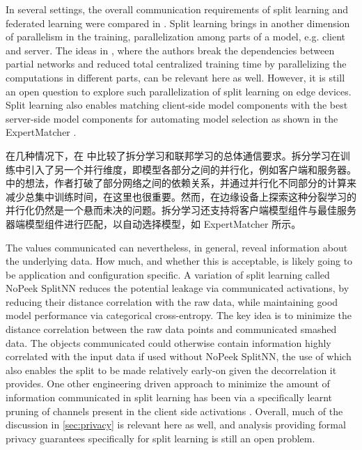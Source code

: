 In several settings, the overall communication requirements of split learning and federated learning were compared in \citep{vepakomma2019splitComm}. Split learning brings in another dimension of parallelism in the training, parallelization among parts of a model, e.g. client and server. The ideas in \citep{jaderberg2017decoupled, huo2018training}, where the authors break the dependencies between partial networks and reduced total centralized training time by parallelizing the computations in different parts, can be relevant here as well. However, it is still an open question to explore such parallelization of split learning on edge devices. Split learning also enables matching client-side model components with the best server-side model components for automating model selection as shown in the ExpertMatcher \cite{sharma2019expertmatcher}.

在几种情况下，在 \citep{vepakomma2019splitComm} 中比较了拆分学习和联邦学习的总体通信要求。拆分学习在训练中引入了另一个并行维度，即模型各部分之间的并行化，例如客户端和服务器。 \citep{jaderberg2017decoupled, huo2018training} 中的想法，作者打破了部分网络之间的依赖关系，并通过并行化不同部分的计算来减少总集中训练时间，在这里也很重要。然而，在边缘设备上探索这种分裂学习的并行化仍然是一个悬而未决的问题。拆分学习还支持将客户端模型组件与最佳服务器端模型组件进行匹配，以自动选择模型，如 ExpertMatcher \cite{sharma2019expertmatcher} 所示。

The values communicated can nevertheless, in general, reveal information about the underlying data. How much, and whether this is acceptable, is likely going to be application and configuration specific. A variation of split learning called NoPeek SplitNN \citep{vepakomma2019reducing} reduces the potential leakage via communicated activations, by reducing their distance correlation \citep{vepakomma2018supervised,szekely2007measuring} with the raw data, while maintaining good model performance via categorical cross-entropy. The key idea is to minimize the distance correlation between the raw data points and communicated smashed data. The objects communicated could otherwise contain information highly correlated with the input data if used without NoPeek SplitNN, the use of which also enables the split to be made relatively early-on given the decorrelation it provides. One other engineering driven approach to minimize the amount of information communicated in split learning has been via a specifically learnt pruning of channels present in the client side activations \citep{channelPruning}. Overall, much of the discussion in \cref{sec:privacy} is relevant here as well, and analysis providing formal privacy guarantees specifically for split learning is still an open problem.


